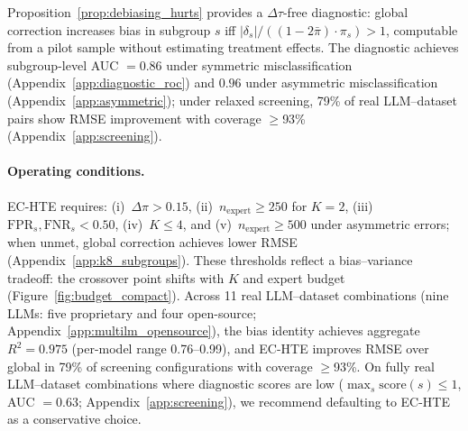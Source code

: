 Proposition~\ref{prop:debiasing_hurts} provides a $\Delta\tau$-free diagnostic: global correction increases bias in subgroup $s$ iff $|\delta_s| / ((1-2\bar{\pi}) \cdot \pi_s) > 1$, computable from a pilot sample without estimating treatment effects.
The diagnostic achieves subgroup-level AUC $= 0.86$ under symmetric misclassification (Appendix~\ref{app:diagnostic_roc}) and $0.96$ under asymmetric misclassification (Appendix~\ref{app:asymmetric}); under relaxed screening, 79\% of real LLM--dataset pairs show RMSE improvement with coverage $\geq$93\% (Appendix~\ref{app:screening}).

\paragraph{Operating conditions.}
EC-HTE requires: (i)~$\Delta\pi > 0.15$, (ii)~$n_{\text{expert}} \geq 250$ for $K{=}2$, (iii)~$\mathrm{FPR}_s, \mathrm{FNR}_s < 0.50$, (iv)~$K \leq 4$, and (v)~$n_{\text{expert}} \geq 500$ under asymmetric errors; when unmet, global correction achieves lower RMSE (Appendix~\ref{app:k8_subgroups}).
These thresholds reflect a bias--variance tradeoff: the crossover point shifts with $K$ and expert budget (Figure~\ref{fig:budget_compact}).
Across 11 real LLM--dataset combinations (nine LLMs: five proprietary and four open-source; Appendix~\ref{app:multilm_opensource}), the bias identity achieves aggregate $R^2 = 0.975$ (per-model range 0.76--0.99), and EC-HTE improves RMSE over global in 79\% of screening configurations with coverage $\geq$93\%.
On fully real LLM--dataset combinations where diagnostic scores are low ($\max_s \mathrm{score}(s) \leq 1$, AUC $= 0.63$; Appendix~\ref{app:screening}), we recommend defaulting to EC-HTE as a conservative choice.

